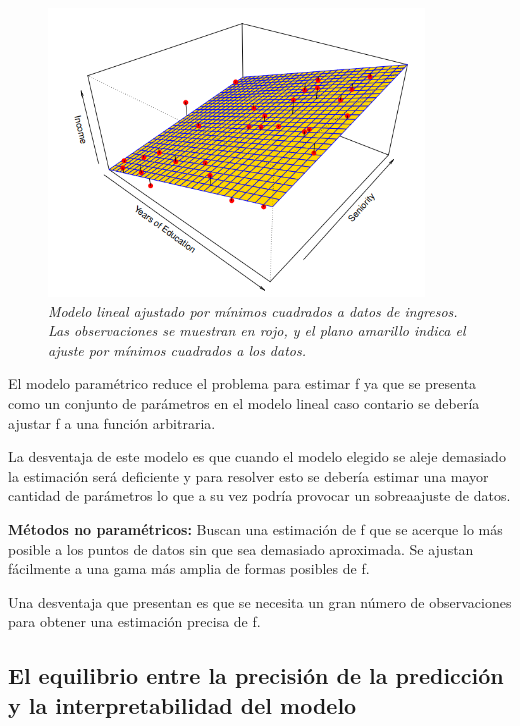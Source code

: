 \documentclass[
  letterpaper,
  DIV=11,
  numbers=noendperiod]{scrartcl}
\begin{document}
\begin{figure}

{\centering \includegraphics[width=3.92708in,height=\textheight]{images/lineal mod.png}

}

\caption{\emph{Modelo lineal ajustado por mínimos cuadrados a datos de
ingresos. Las observaciones se muestran en rojo, y el plano amarillo
indica el ajuste por mínimos cuadrados a los datos.}}

\end{figure}

El modelo paramétrico reduce el problema para estimar f ya que se
presenta como un conjunto de parámetros en el modelo lineal caso
contario se debería ajustar f a una función arbitraria.

La desventaja de este modelo es que cuando el modelo elegido se aleje
demasiado la estimación será deficiente y para resolver esto se debería
estimar una mayor cantidad de parámetros lo que a su vez podría provocar
un sobreaajuste de datos.

\textbf{Métodos no paramétricos:} Buscan una estimación de f que se
acerque lo más posible a los puntos de datos sin que sea demasiado
aproximada. Se ajustan fácilmente a una gama más amplia de formas
posibles de f.

Una desventaja que presentan es que se necesita un gran número de
observaciones para obtener una estimación precisa de f.

\hypertarget{el-equilibrio-entre-la-precisiuxf3n-de-la-predicciuxf3n-y-la-interpretabilidad-del-modelo}{%
\subsection{El equilibrio entre la precisión de la predicción y la
interpretabilidad del
modelo}\label{el-equilibrio-entre-la-precisiuxf3n-de-la-predicciuxf3n-y-la-interpretabilidad-del-modelo}}
\end{document}
